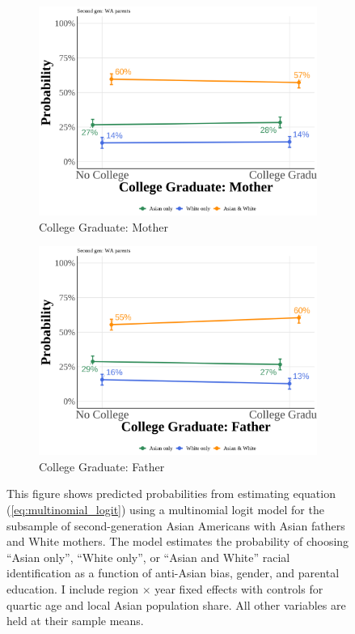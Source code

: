 \begin{center}
\begin{figure}[!htb]
\vspace{0.5cm}

\begin{subfigure}{.48\textwidth}
\caption{College Graduate: Mother}
\centering
\includegraphics[width=1\linewidth]{simple_pp_MomGradCollege_second_wa.png}
\end{subfigure}
\hfill
\begin{subfigure}{.48\textwidth}
\caption{College Graduate: Father}
\centering
\includegraphics[width=1\linewidth]{simple_pp_DadGradCollege_second_wa.png}
\end{subfigure}

\caption*{\footnotesize{This figure shows predicted probabilities from estimating equation (\ref{eq:multinomial_logit}) using a multinomial logit model for the subsample of second-generation Asian Americans with Asian fathers and White mothers. The model estimates the probability of choosing ``Asian only'', ``White only'', or ``Asian and White'' racial identification as a function of anti-Asian bias, gender, and parental education. I include region $\times$ year fixed effects with controls for quartic age and local Asian population share. All other variables are held at their sample means.}}
\end{figure}
\end{center}

